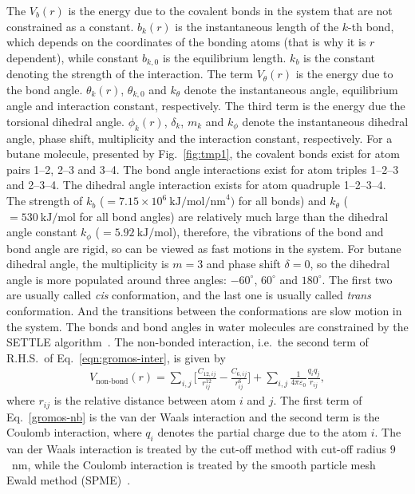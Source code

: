\documentclass[final]{siamltex}
\begin{document}
The $V_b(r)$ is the energy due to the covalent bonds in the system that
are not constrained as a constant. $b_k(r)$ is the instantaneous
length of the $k$-th bond, which depends on the coordinates of the
bonding atoms (that is why it is $r$ dependent), while constant
$b_{k,0}$ is the equilibrium length. $k_b$ is the constant denoting
the strength of the interaction. The term $V_\theta(r)$ is the energy
due to the bond angle. $\theta_k(r)$, $\theta_{k,0}$ and $k_\theta$
denote the instantaneous angle, equilibrium angle and interaction
constant, respectively. The third term is the energy due the torsional
dihedral angle.  $\phi_k(r)$, $\delta_k$, $m_k$ and $k_\phi$ denote
the instantaneous dihedral angle, phase shift, multiplicity and the
interaction constant, respectively. For a butane molecule, presented
by Fig.~\ref{fig:tmp1}, the covalent bonds exist for atom pairs 1--2,
2--3 and 3--4. The bond angle interactions exist for atom triples
1--2--3 and 2--3--4. The dihedral angle interaction exists for atom
quadruple 1--2--3--4. The strength of $k_b$ ($=7.15\times
10^6~\textrm{kJ/mol/nm}^4)$ for all bonds) and $k_\theta$
($=530~\textrm{kJ/mol}$ for all bond angles) are relatively much large
than the dihedral angle constant $k_\phi$ ($=5.92~\textrm{kJ/mol}$),
therefore, the vibrations of the bond and bond angle are rigid, so can
be viewed as fast motions in the system. For butane dihedral angle,
the multiplicity is $m=3$ and phase shift $\delta = 0$, so the
dihedral angle is more populated around three angles: $-60^\circ$,
$60^\circ$ and $180^\circ$. The first two are usually called
\emph{cis} conformation, and the last one is usually called
\emph{trans} conformation. And the transitions between the
conformations are slow motion in the system. The bonds and bond angles
in water molecules are constrained by the SETTLE
algorithm~\cite{miyamoto2004settle}.  The non-bonded interaction,
i.e.~the second term of R.H.S.~of Eq.~\eqref{eqn:gromos-inter}, is
given by
\begin{align}\label{gromos-nb}
  V_{\textrm{non-bond}}(r) =
  \sum_{i,j} \bigg[\frac{C_{12,ij}}{r_{ij}^{12}} - \frac{C_{6,ij}}{r_{ij}^{6}}\bigg]
  +
  \sum_{i,j}\frac{1}{4\pi\varepsilon_0} \frac{q_i q_j}{ r_{ij}},
\end{align}
where $r_{ij}$ is the relative distance between atom $i$ and $j$. The
first term of Eq.~\eqref{gromos-nb} is the van der Waals interaction
and the second term is the Coulomb interaction, where $q_i$ denotes the
partial charge due to the atom $i$. The van der Waals interaction is
treated by the cut-off method with cut-off radius $9$~nm, while the Coulomb
interaction is treated by the smooth particle mesh Ewald
method (SPME)~\cite{essmann1995spm}.
\end{document}
